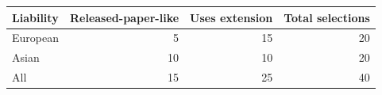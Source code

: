 \begin{tabular}{lrrr}
\toprule
Liability & Released-paper-like & Uses extension & Total selections \\
\midrule
European & 5 & 15 & 20 \\
Asian & 10 & 10 & 20 \\
All & 15 & 25 & 40 \\
\bottomrule
\end{tabular}
